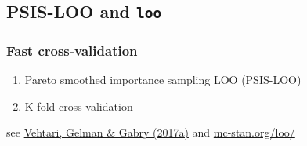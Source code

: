 \documentclass[10pt]{beamer}
\begin{document}
\begin{frame}{}
  \\

\end{frame}


\subsection{PSIS-LOO and \texttt{loo}}
\begin{frame}{}

\frametitle{ Fast cross-validation}

\begin{enumerate}
\item Pareto smoothed importance sampling LOO (PSIS-LOO)
\item K-fold cross-validation
\end{enumerate}

\vspace{12\baselineskip}

{\small see \href{http://link.springer.com/article/10.1007/s11222-016-9696-4}{Vehtari, Gelman \& Gabry (2017a)} and \url{mc-stan.org/loo/}}

\end{frame}

\end{document}
